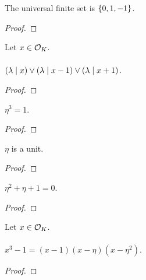 \begin{lemma}
    \label{lmm:univ_quot}
    \leanok
    The universal finite set is $\left\{0, 1, -1\right\}$.
\end{lemma}
\begin{proof}
    \leanok
\end{proof}

\begin{lemma}
    \label{lmm:dvd_or_dvd_sub_one_or_dvd_add_one}
    \leanok
    Let $x \in \mathcal{O}_K$. \\\\
    $(\lambda \mid x) \lor (\lambda \mid x-1) \lor (\lambda \mid x+1)$.
\end{lemma}
\begin{proof}
    \leanok
\end{proof}

\begin{lemma}
    \label{lmm:toInteger_cube_eq_one}
    \leanok
    $\eta^3 = 1$.
\end{lemma}
\begin{proof}
    \leanok
\end{proof}

\begin{lemma}
    \label{lmm:eta_isUnit}
    \leanok
    $\eta$ is a unit.
\end{lemma}
\begin{proof}
    \leanok
\end{proof}

\begin{lemma}
    \label{lmm:toInteger_eval_cyclo}
    \leanok
    $\eta^2 + \eta + 1 = 0$.
\end{lemma}
\begin{proof}
    \leanok
\end{proof}

\begin{lemma}
    \label{lmm:cube_sub_one}
    \leanok
    Let $x \in \mathcal{O}_K$. \\\\
    $x^3 - 1 = (x - 1)(x - \eta)(x - \eta^ 2)$.
\end{lemma}
\begin{proof}
    \leanok
\end{proof}

